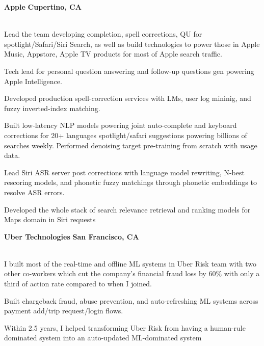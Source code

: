 \documentclass[10pt,letterpaper]{article}
\begin{document}
\noindent\textbf{Apple} \hfill \textbf{Cupertino, CA}\\
\\
\vspace{-10pt}
\begin{rbullets}\small
\item Lead the team developing completion, spell corrections, QU for spotlight/Safari/Siri Search, as well as build technologies to power those in Apple Music, Appstore, Apple TV products for most of Apple search traffic.
\item Tech lead for personal question answering and follow-up questions gen powering Apple Intelligence.
\item Developed production spell-correction services with LMs, user log mininig, and fuzzy inverted-index matching.
\item Built low-latency NLP models powering joint auto-complete and keyboard corrections for 20+ languages spotlight/safari suggestions powering billions of searches weekly. Performed denoising target pre-training from scratch with usage data.
\item Lead Siri ASR server post corrections with language model rewriting, N-best rescoring models, and phonetic fuzzy matchings through phonetic embeddings to resolve ASR errors.
\item Developed the whole stack of search relevance retrieval and ranking models for Maps domain in Siri requests
\end{rbullets}

\noindent\textbf{Uber Technologies} \hfill \textbf{San Francisco, CA}\\
\\
\vspace{-10pt}
\begin{rbullets}\small
\item I built most of the real-time and offline ML systems in Uber Risk team with two other co-workers which cut the company's financial fraud loss by 60\% with only a third of action rate compared to when I joined.
\item Built chargeback fraud, abuse prevention, and auto-refreshing ML systems across payment add/trip request/login flows.
\item Within 2.5 years, I helped transforming Uber Risk from having a human-rule dominated system into an auto-updated ML-dominated system
\end{rbullets}
\end{document}
